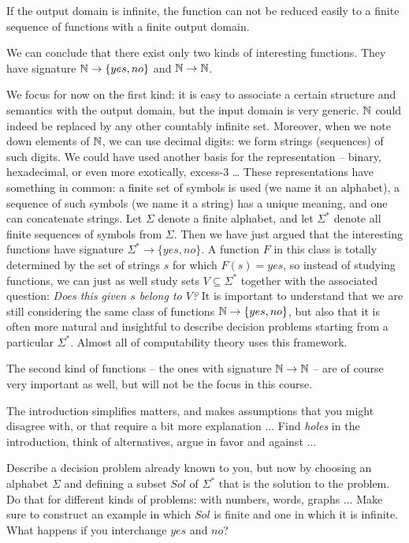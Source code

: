 If the output domain is infinite, the function can not be reduced
easily to a finite sequence of functions with a finite output domain.

We can conclude that there exist only two kinds of interesting
functions. They have signature $\mathbb{N} \rightarrow\{yes, no\}$ and $\mathbb{N} \rightarrow \mathbb{N}$.

We focus for now on the first kind: it is easy to associate a certain
structure and semantics with the output domain, but the input domain
is very generic. $\mathbb{N}$ could indeed be replaced by any other countably
infinite set. Moreover, when we note down elements of $\mathbb{N}$, we can use
decimal digits: we form strings (sequences) of such digits. We could
have used another basis for the representation -- binary, hexadecimal,
or even more exotically, excess-3 \ldots{} These representations have something
in common: a finite set of symbols is used (we name it an alphabet), a
sequence of such symbols (we name it a string) has a unique meaning,
and one can concatenate strings.
%
Let $\Sigma$ denote a finite alphabet, and let $\Sigma^*$ denote all
finite sequences of symbols from $\Sigma$. Then we have just argued
that the interesting functions have signature $\Sigma^* \rightarrow
\{yes, no\}$. A function $F$ in this class is totally determined by the
set of strings $s$ for which $F(s) = yes$, so instead of studying
functions, we can just as well study sets $V\subseteq\Sigma^*$
together with the associated question: {\em Does this given $s$ belong to
$V$?} It is important to understand that we are still considering the
same class of functions $\mathbb{N} \rightarrow\{yes, no\}$, but also that it
is often more natural and insightful to describe decision problems
starting from a particular $\Sigma^*$. Almost all of computability
theory uses this framework.

The second kind of functions -- the ones with signature $\mathbb{N} \rightarrow
\mathbb{N}$ -- are of course very important as well, but will not be the focus
in this course.
\begin{exercise}
The introduction simplifies matters, and makes assumptions that you
might disagree with, or that require a bit more explanation ... Find {\em
holes} in the introduction, think of alternatives, argue in favor and
against ...

Describe a decision problem already known to you, but now by choosing
an alphabet $\Sigma$ and defining a subset $Sol$ of $\Sigma^*$ that is
the solution to the problem. Do that for different kinds of problems:
with numbers, words, graphs ... Make sure to construct an example in
which $Sol$ is finite and one in which it is infinite. What happens if
you interchange $yes$ and $no$?

\end{exercise}


